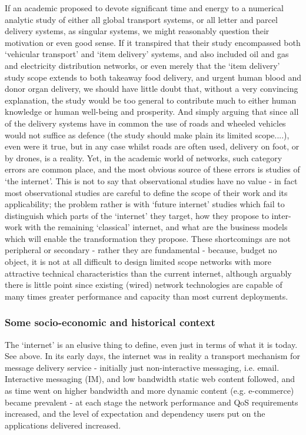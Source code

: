 If an academic proposed to devote significant time and energy to a numerical analytic study of either all global transport systems, or all letter and parcel delivery systems, as singular systems,
we might reasonably
question their motivation or even good sense.
If it transpired that their study encompassed both ‘vehicular transport’ and ‘item delivery’ systems, and also included oil and gas and electricity distribution networks, or even merely that the ‘item delivery’ study scope extends to both takeaway food delivery, and urgent human blood and donor organ delivery, we should have little doubt that, without a very convincing explanation, the study would be too general to contribute much to either human knowledge or human well-being and prosperity.
And simply arguing that since all of the delivery systems have in common the use of roads and wheeled vehicles would not suffice as defence (the study should make plain its limited scope....), even were it true, but in any case whilst roads are often used, delivery on foot, or by drones, is a reality.
Yet, in the academic world of networks, such category errors are common place, and the most obvious source of these errors is studies of ‘the internet’.
This is not to say that observational studies have no value - in fact most observational studies are careful to define the scope of their work and its applicability; the problem rather is with ‘future internet’ studies which fail to distinguish which parts of the ‘internet’ they target, how they propose to inter-work with the remaining ‘classical’ internet, and what are the business models which will enable the transformation they propose.
These shortcomings are not peripheral or secondary - rather they are fundamental - because, budget no object, it is not at all difficult to design limited scope networks with more attractive technical characteristics than the current internet, although arguably there is little point since existing (wired) network technologies are capable of many times greater performance and capacity than most current deployments.

\subsubsection{Some socio-economic and historical context}

The ‘internet’ is an elusive thing to define, even just in terms of what it is today.
See above.
In its early days, the internet was in reality a transport mechanism for message delivery service - initially just non-interactive messaging, i.e. email.
Interactive messaging (IM), and low bandwidth static web content followed, and as time went on higher bandwidth and more dynamic content (e.g. e-commerce) became prevalent - at each stage the network performance and QoS requirements increased, and the level of expectation and dependency users put on the applications delivered increased.

